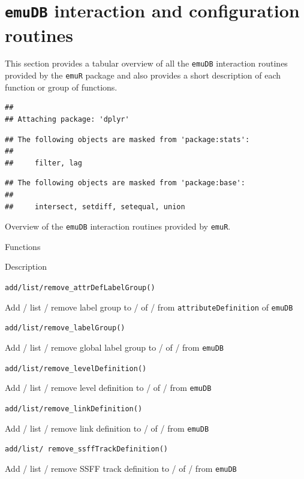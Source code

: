 \documentclass[]{book}
\theoremstyle{definition}
\theoremstyle{definition}
\theoremstyle{definition}
\theoremstyle{remark}
\begin{document}
\hypertarget{sec:emuRpackageDetails-emuDBinteract}{%
\section{\texorpdfstring{\texttt{emuDB} interaction and configuration
routines}{emuDB interaction and configuration routines}}\label{sec:emuRpackageDetails-emuDBinteract}}

This section provides a tabular overview of all the \texttt{emuDB}
interaction routines provided by the \texttt{emuR} package and also
provides a short description of each function or group of functions.

\begin{verbatim}
## 
## Attaching package: 'dplyr'
\end{verbatim}

\begin{verbatim}
## The following objects are masked from 'package:stats':
## 
##     filter, lag
\end{verbatim}

\begin{verbatim}
## The following objects are masked from 'package:base':
## 
##     intersect, setdiff, setequal, union
\end{verbatim}

\label{tab:emuRpackageDetails-emuDBinteract}Overview of the \texttt{emuDB}
interaction routines provided by \texttt{emuR}.

Functions

Description

\texttt{add/list/remove\_attrDefLabelGroup()}

Add / list / remove label group to / of / from
\texttt{attributeDefinition} of \texttt{emuDB}

\texttt{add/list/remove\_labelGroup()}

Add / list / remove global label group to / of / from \texttt{emuDB}

\texttt{add/list/remove\_levelDefinition()}

Add / list / remove level definition to / of / from \texttt{emuDB}

\texttt{add/list/remove\_linkDefinition()}

Add / list / remove link definition to / of / from \texttt{emuDB}

\texttt{add/list/\ remove\_ssffTrackDefinition()}

Add / list / remove SSFF track definition to / of / from \texttt{emuDB}
\end{document}
